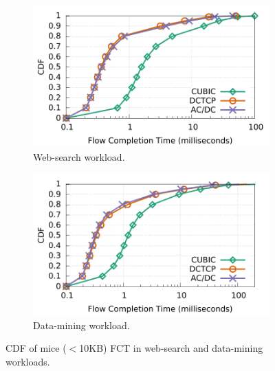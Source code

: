 \begin{figure}[!t]
        \centering
        \begin{subfigure}[b]{0.45\textwidth}
                \centering
                \includegraphics[width=\textwidth]{acdctcp/figures/macro_benchmarks/trace-driven/trace_driven_workload_dctcp_senders5_10points.pdf}
                \caption{Web-search workload.}
                \label{trace-driven-searching-fct}
        \end{subfigure}
        \begin{subfigure}[b]{0.45\textwidth}
                \centering
                \includegraphics[width=\textwidth]{acdctcp/figures/macro_benchmarks/trace-driven/trace_driven_workload_conga_senders5_10points.pdf}
                \caption{Data-mining workload.}
                \label{trace-driven-data-mining-fct}
        \end{subfigure}
        \caption{CDF of mice ($<$10KB) FCT in web-search and data-mining workloads.}
        \label{macro-trace-driven-fct}
\end{figure}
\fi


